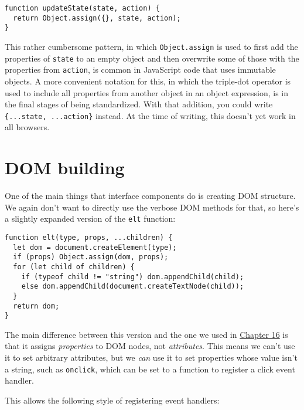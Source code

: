 \begin{lstlisting}
function updateState(state, action) {
  return Object.assign({}, state, action);
}
\end{lstlisting}
\noindent{}

This rather cumbersome pattern, in which \lstinline`Object.assign` is used to first add the properties of \lstinline`state` to an empty object and then overwrite some of those with the properties from \lstinline`action`, is common in JavaScript code that uses immutable objects. A more convenient notation for this, in which the triple-dot operator is used to include all properties from another object in an object expression, is in the final stages of being standardized. With that addition, you could write \lstinline`{...state, ...action}` instead. At the time of writing, this doesn't yet work in all browsers.

\section{DOM building}

One of the main things that interface components do is creating DOM structure. We again don't want to directly use the verbose DOM methods for that, so here's a slightly expanded version of the \lstinline`elt` function:

\begin{lstlisting}
function elt(type, props, ...children) {
  let dom = document.createElement(type);
  if (props) Object.assign(dom, props);
  for (let child of children) {
    if (typeof child != "string") dom.appendChild(child);
    else dom.appendChild(document.createTextNode(child));
  }
  return dom;
}
\end{lstlisting}
\noindent{}

The main difference between this version and the one we used in \hyperref[game.domdisplay]{Chapter 16} is that it assigns \emph{properties} to DOM nodes, not \emph{attributes}. This means we can't use it to set arbitrary attributes, but we \emph{can} use it to set properties whose value isn't a string, such as \lstinline`onclick`, which can be set to a function to register a click event handler.

This allows the following style of registering event handlers:

